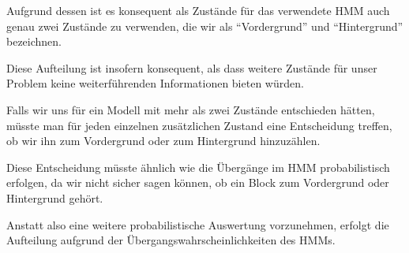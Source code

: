 Aufgrund dessen ist es konsequent als Zustände für das verwendete HMM auch genau zwei Zustände zu verwenden, die wir als “Vordergrund” und “Hintergrund” bezeichnen.

Diese Aufteilung ist insofern konsequent, als dass weitere Zustände für unser Problem keine weiterführenden Informationen bieten würden.

Falls wir uns für ein Modell mit mehr als zwei Zustände entschieden hätten, müsste man für jeden einzelnen zusätzlichen Zustand eine Entscheidung treffen, ob wir ihn zum Vordergrund oder zum Hintergrund hinzuzählen.

Diese Entscheidung müsste ähnlich wie die Übergänge im HMM probabilistisch erfolgen, da wir nicht sicher sagen können, ob ein Block zum Vordergrund oder Hintergrund gehört.

Anstatt also eine weitere probabilistische Auswertung vorzunehmen, erfolgt die Aufteilung aufgrund der Übergangswahrscheinlichkeiten des HMMs.


